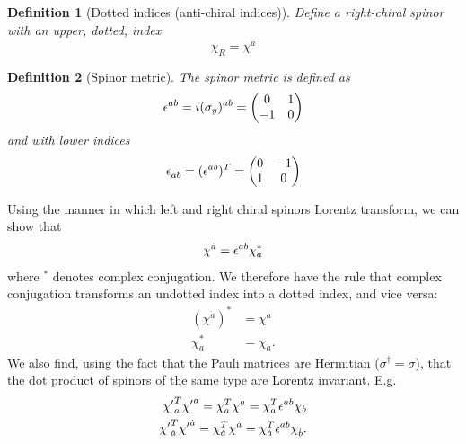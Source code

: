 \documentclass[11pt]{article}
\numberwithin{equation}{section}
\newcommand{\tn}[2]{\tensor{#1}{#2}}
\newtheorem{defn}{Definition}[section]
\begin{document}
\begin{defn}[Dotted indices (anti-chiral indices)]
Define a right-chiral spinor with an upper, dotted, index
\begin{equation}
\chi_R = \chi^{\dot{a}}
\end{equation}
\end{defn}

\begin{defn}[Spinor metric]
The spinor metric is defined as 
\begin{equation}
\tn{\epsilon}{^a^b} = i \tn{(\sigma_y)}{^a^b} = \begin{pmatrix}
0 & 1 \\
-1 & 0
\end{pmatrix}
\end{equation}
and with lower indices
\begin{equation}
\tn{\epsilon}{_a_b} = (\tn{\epsilon}{^a^b})^T = \begin{pmatrix}
0 & -1 \\
1 & 0
\end{pmatrix}
\end{equation}
\end{defn}

Using the manner in which left and right chiral spinors Lorentz transform, we can show that
\begin{equation}
\chi^{\dot{a}} = \tn{\epsilon}{^a^b} \chi^*_a
\end{equation}
where $^*$ denotes complex conjugation. We therefore have the rule that complex conjugation transforms an undotted index into a dotted index, and vice versa:
\begin{align}
(\chi^{\dot{a}})^* &= \chi^a  \\
\chi_a^* &= \chi_{\dot{a}}.
\end{align}
We also find, using the fact that the Pauli matrices are Hermitian ($\sigma^\dagger = \sigma$), that the dot product of spinors of the same type are Lorentz invariant. E.g.
\begin{align}
{\chi'}_a^T {\chi'}^a = \chi_a^T \chi^a = \chi_a^T \tn{\epsilon}{^a^b}\chi_b \\
{\chi'}_{\dot{a}}^T {\chi'}^{\dot{a}} = \chi_{\dot{a}}^T \chi^{\dot{a}} = \chi_{\dot{a}}^T \tn{\epsilon}{^a^b}\chi_{\dot{b}}.
\end{align}
\end{document}
